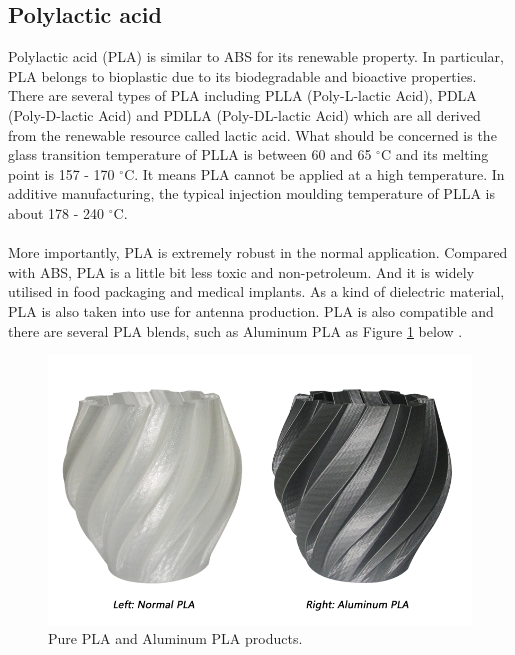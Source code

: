 \subsection{Polylactic acid}

Polylactic acid (PLA) is similar to ABS for its renewable property. In particular, PLA belongs to bioplastic due to its biodegradable and bioactive properties. There are several types of PLA including PLLA (Poly-L-lactic Acid), PDLA (Poly-D-lactic Acid) and PDLLA (Poly-DL-lactic Acid) which are all derived from the renewable resource called lactic acid\cite{sodergaard2010industrial}. What should be concerned is the glass transition temperature of PLLA is between 60 and 65 $^{\circ}$C and its melting point is 157 - 170 $^{\circ}$C. It means PLA cannot be applied at a high temperature. In additive manufacturing, the typical injection moulding temperature of PLLA is about 178 - 240 $^{\circ}$C.\\
\\
More importantly, PLA is extremely robust in the normal application. Compared with ABS, PLA is a little bit less toxic and non-petroleum. And it is widely utilised in food packaging\cite{marra2017assessment} and medical implants\cite{bergstrom2016overview}. As a kind of dielectric material, PLA is also taken into use for antenna production\cite{mirzaee2016high}. PLA is also compatible and there are several PLA blends, such as Aluminum PLA as Figure \ref{Fig:PLA product} below .

\begin{figure}[htbp]
  \centering
 \includegraphics[scale=0.4]{Figs//aluminum-PLA_2.png}
  \caption[Pure PLA and Aluminum PLA products]{\footnotesize Pure PLA and Aluminum PLA products.}
  \label{Fig:PLA product}
\end{figure}


